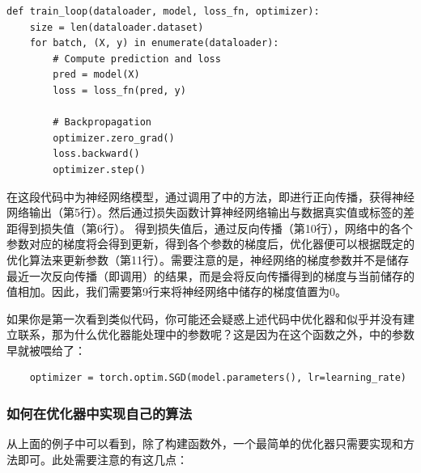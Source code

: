 \begin{lstlisting}
def train_loop(dataloader, model, loss_fn, optimizer):
    size = len(dataloader.dataset)
    for batch, (X, y) in enumerate(dataloader):
        # Compute prediction and loss
        pred = model(X)
        loss = loss_fn(pred, y)
        
        # Backpropagation
        optimizer.zero_grad()
        loss.backward()
        optimizer.step()
\end{lstlisting}
    
在这段代码中为神经网络模型，通过调用了中的方法，即进行正向传播，获得神经网络输出（第5行）。然后通过损失函数计算神经网络输出与数据真实值或标签的差距得到损失值（第6行）。
得到损失值后，通过反向传播（第10行），网络中的各个参数对应的梯度将会得到更新，得到各个参数的梯度后，优化器便可以根据既定的优化算法来更新参数（第11行）。需要注意的是，神经网络的梯度参数并不是储存最近一次反向传播（即调用）的结果，而是会将反向传播得到的梯度与当前储存的值相加。因此，我们需要第9行来将神经网络中储存的梯度值置为0。

如果你是第一次看到类似代码，你可能还会疑惑上述代码中优化器和似乎并没有建立联系，那为什么优化器能处理中的参数呢？这是因为在这个函数之外，中的参数早就被喂给了：
\begin{lstlisting}
    optimizer = torch.optim.SGD(model.parameters(), lr=learning_rate)
\end{lstlisting}

\subsubsection{如何在优化器中实现自己的算法}

从上面的例子中可以看到，除了构建函数外，一个最简单的优化器只需要实现和方法即可。此处需要注意的有这几点：

